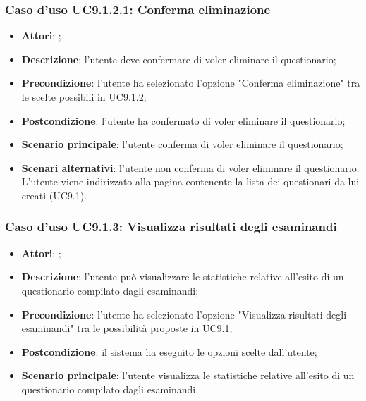 				\subsubsection{Caso d'uso UC9.1.2.1: Conferma eliminazione}
				\label{UC9.1.2.1}
				\begin{itemize}
					\item \textbf{Attori}: \uaupro;
					\item \textbf{Descrizione}: l'utente deve confermare di voler eliminare il questionario; 
					\item \textbf{Precondizione}: l'utente ha selezionato l'opzione "Conferma eliminazione" tra le scelte possibili in UC9.1.2;
					\item \textbf{Postcondizione}: l'utente ha confermato di voler eliminare il questionario;
					\item \textbf{Scenario principale}: l'utente conferma di voler eliminare il questionario;
					\item \textbf{Scenari alternativi}: l'utente non conferma di voler eliminare il questionario. L'utente viene indirizzato alla pagina contenente la lista dei questionari da lui creati (UC9.1).
				\end{itemize}
								
		\subsubsection{Caso d'uso UC9.1.3: Visualizza risultati degli esaminandi}
		\label{UC9.1.3}
		\begin{itemize}
			\item \textbf{Attori}: \uaupro;
			\item \textbf{Descrizione}: l'utente può visualizzare le statistiche relative all'esito di un  questionario compilato dagli esaminandi;
			\item \textbf{Precondizione}: l'utente ha selezionato l'opzione "Visualizza risultati degli esaminandi" tra le possibilità proposte in UC9.1;
			\item \textbf{Postcondizione}: il sistema ha eseguito le opzioni scelte dall'utente;
			\item \textbf{Scenario principale}: l'utente visualizza le statistiche relative all'esito di un questionario compilato dagli esaminandi. 
		\end{itemize}
		
